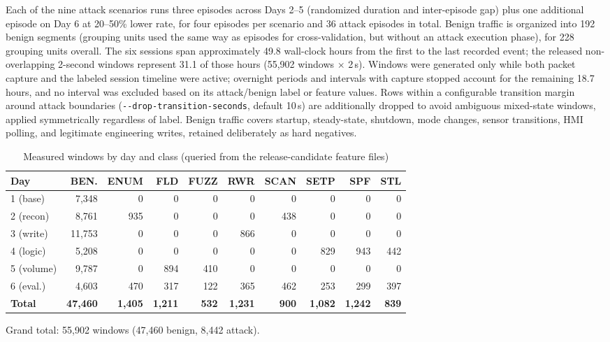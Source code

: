 \documentclass[conference]{IEEEtran}
\begin{document}
Each of the nine attack scenarios runs three episodes across Days 2--5 (randomized duration and
inter-episode gap) plus one additional episode on Day 6 at 20--50\% lower rate, for four episodes per
scenario and 36 attack episodes in total. Benign traffic is organized into 192 benign segments (grouping
units used the same way as episodes for cross-validation, but without an attack execution phase), for 228
grouping units overall. The six sessions span approximately 49.8 wall-clock hours from the first to the
last recorded event; the released non-overlapping 2-second windows represent 31.1 of those hours (55{,}902
windows $\times$ 2\,s). Windows were generated only while both packet capture and the labeled session
timeline were active; overnight periods and intervals with capture stopped account for the remaining 18.7
hours, and no interval was excluded based on its attack/benign label or feature values. Rows within a
configurable transition margin around attack boundaries
(\texttt{-{}-drop-transition-seconds}, default 10\,s) are additionally dropped to avoid ambiguous
mixed-state windows, applied symmetrically regardless of label. Benign traffic covers startup,
steady-state, shutdown, mode changes, sensor transitions, HMI polling, and legitimate engineering writes,
retained deliberately as hard negatives.

\begin{table}[t]
\caption{Measured windows by day and class (queried from the release-candidate feature files)}
\label{tab:byday}
\centering
\scriptsize
\setlength{\tabcolsep}{3pt}
\begin{tabular}{lrrrrrrrrr}
\toprule
Day & BEN. & ENUM & FLD & FUZZ & RWR & SCAN & SETP & SPF & STL \\
\midrule
1 (base)  & 7{,}348  & 0   & 0   & 0   & 0   & 0   & 0   & 0   & 0 \\
2 (recon) & 8{,}761  & 935 & 0   & 0   & 0   & 438 & 0   & 0   & 0 \\
3 (write) & 11{,}753 & 0   & 0   & 0   & 866 & 0   & 0   & 0   & 0 \\
4 (logic) & 5{,}208  & 0   & 0   & 0   & 0   & 0   & 829 & 943 & 442 \\
5 (volume)& 9{,}787  & 0   & 894 & 410 & 0   & 0   & 0   & 0   & 0 \\
6 (eval.) & 4{,}603  & 470 & 317 & 122 & 365 & 462 & 253 & 299 & 397 \\
\midrule
\textbf{Total} & \textbf{47{,}460} & \textbf{1{,}405} & \textbf{1{,}211} & \textbf{532} &
\textbf{1{,}231} & \textbf{900} & \textbf{1{,}082} & \textbf{1{,}242} & \textbf{839} \\
\bottomrule
\end{tabular}

\vspace{2pt}
\raggedright\footnotesize Grand total: 55{,}902 windows (47{,}460 benign, 8{,}442 attack).
\end{table}
\end{document}
